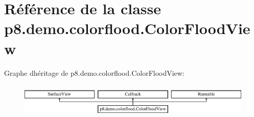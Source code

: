 \hypertarget{classp8_1_1demo_1_1colorflood_1_1_color_flood_view}{}\section{Référence de la classe p8.\+demo.\+colorflood.\+Color\+Flood\+View}
\label{classp8_1_1demo_1_1colorflood_1_1_color_flood_view}
Graphe d\textquotesingle{}héritage de p8.\+demo.\+colorflood.\+Color\+Flood\+View\+:\begin{figure}[H]
\begin{center}
\leavevmode
\includegraphics[height=1.666667cm]{classp8_1_1demo_1_1colorflood_1_1_color_flood_view}
\end{center}
\end{figure}
